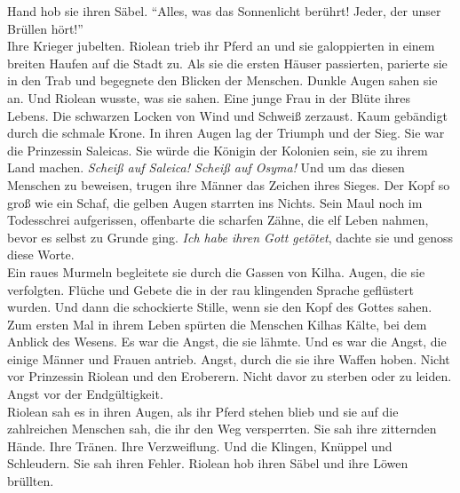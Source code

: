 Hand hob sie ihren Säbel. ``Alles, was das Sonnenlicht berührt! Jeder, der unser Brüllen hört!''\\
Ihre Krieger jubelten. Riolean trieb ihr Pferd an und sie galoppierten in einem breiten Haufen 
auf die Stadt zu. Als sie die ersten Häuser passierten, parierte sie in den Trab und begegnete den 
Blicken der Menschen. Dunkle Augen sahen sie an. Und Riolean wusste, was sie sahen. Eine junge Frau 
in der Blüte ihres Lebens. Die schwarzen Locken von Wind und Schweiß zerzaust. Kaum gebändigt durch 
die schmale Krone. In ihren Augen lag der Triumph und der Sieg. Sie war die Prinzessin Saleicas. 
Sie würde die Königin der Kolonien sein, sie zu ihrem Land machen. \textit{Scheiß auf Saleica! 
Scheiß auf Osyma!}
Und um das diesen Menschen zu beweisen, trugen ihre Männer das Zeichen ihres Sieges. Der Kopf so 
groß wie ein Schaf, die gelben Augen starrten ins Nichts. Sein Maul noch im Todesschrei 
aufgerissen, offenbarte die scharfen Zähne, die elf Leben nahmen, bevor es selbst zu Grunde ging.
\textit{Ich habe ihren Gott getötet}, dachte sie und genoss diese Worte.\\
Ein raues Murmeln begleitete sie durch die Gassen von Kilha. Augen, die sie verfolgten. Flüche und 
Gebete die in der rau klingenden Sprache geflüstert wurden. Und dann die schockierte Stille, wenn 
sie den Kopf des Gottes sahen. Zum ersten Mal in ihrem Leben spürten die Menschen Kilhas Kälte, bei 
dem Anblick des Wesens. Es war die Angst, die sie lähmte. Und es war die Angst, die einige Männer 
und Frauen antrieb. Angst, durch die sie ihre Waffen hoben. Nicht vor Prinzessin Riolean und den 
Eroberern. Nicht davor zu sterben oder zu leiden. Angst vor der Endgültigkeit.\\
Riolean sah es in ihren Augen, als ihr Pferd stehen blieb und sie auf die zahlreichen Menschen sah, 
die ihr den Weg versperrten. Sie sah ihre zitternden Hände. Ihre Tränen. Ihre Verzweiflung. Und die 
Klingen, Knüppel und Schleudern. Sie sah ihren Fehler. Riolean hob ihren Säbel und ihre Löwen 
brüllten.